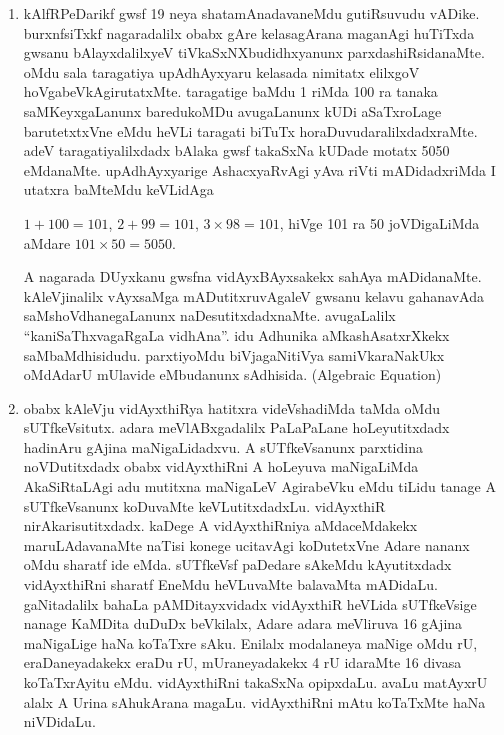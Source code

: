\begin{enumerate}[\rm 1)]
\item kAlfRPeDarikf gwsf {\rm 19} neya shatamAnadavaneMdu gutiRsuvudu vADike. burxnfsiTxkf nagaradalilx obabx gAre kelasagArana maganAgi huTiTxda gwsanu bAlayxdalilxyeV tiVkaSxNXbudidhxyanunx parxdashiRsidanaMte. oMdu sala taragatiya upAdhAyxyaru kelasada nimitatx elilxgoV hoVgabeVkAgirutatxMte. taragatige baMdu {\rm 1} riMda {\rm 100} ra tanaka saMKeyxgaLanunx baredukoMDu avugaLanunx kUDi aSaTxroLage barutetxtxVne eMdu heVLi taragati biTuTx horaDuvudaralilxdadxraMte. adeV taragatiyalilxdadx bAlaka gwsf takaSxNa kUDade motatx {\rm 5050} eMdanaMte. upAdhAyxyarige AshacxyaRvAgi yAva riVti mADidadxriMda I utatxra baMteMdu keVLidAga

$1+100=101$, $2+99=101$, $3\times 98=101$, hiVge {\rm 101} ra {\rm 50} joVDigaLiMda aMdare  $101\times 50=5050$.

A nagarada DUyxkanu gwsfna vidAyxBAyxsakekx sahAya mADidanaMte. kAleVjinalilx vAyxsaMga mADutitxruvAgaleV gwsanu kelavu gahanavAda saMshoVdhanegaLanunx naDesutitxdadxnaMte. avugaLalilx ``kaniSaThxvagaRgaLa vidhAna''. idu Adhunika aMkashAsatxrXkekx saMbaMdhisidudu. parxtiyoMdu biVjagaNitiVya samiVkaraNakUkx oMdAdarU mUlavide eMbudanunx sAdhisida. {\rm (Algebraic Equation)}  

\item obabx kAleVju vidAyxthiRya hatitxra videVshadiMda taMda oMdu sUTfkeVsitutx. adara meVlABxgadalilx PaLaPaLane hoLeyutitxdadx hadinAru gAjina maNigaLidadxvu. A sUTfkeVsanunx parxtidina noVDutitxdadx obabx vidAyxthiRni A hoLeyuva maNigaLiMda AkaSiRtaLAgi adu mutitxna maNigaLeV AgirabeVku eMdu tiLidu tanage A sUTfkeVsanunx koDuvaMte keVLutitxdadxLu. vidAyxthiR nirAkarisutitxdadx. kaDege A vidAyxthiRniya aMdaceMdakekx maruLAdavanaMte naTisi konege ucitavAgi koDutetxVne Adare nananx oMdu sharatf ide eMda. sUTfkeVsf paDedare sAkeMdu kAyutitxdadx vidAyxthiRni sharatf EneMdu heVLuvaMte balavaMta mADidaLu. gaNitadalilx bahaLa pAMDitayxvidadx vidAyxthiR heVLida sUTfkeVsige nanage  KaMDita duDuDx beVkilalx, Adare adara meVliruva {\rm 16} gAjina maNigaLige haNa koTaTxre sAku. Enilalx modalaneya maNige oMdu rU, eraDaneyadakekx eraDu rU, mUraneyadakekx {\rm 4} rU idaraMte {\rm 16} divasa koTaTxrAyitu eMdu. vidAyxthiRni takaSxNa opipxdaLu. avaLu matAyxrU alalx A Urina sAhukArana magaLu. vidAyxthiRni mAtu koTaTxMte haNa niVDidaLu.


\end{enumerate}
